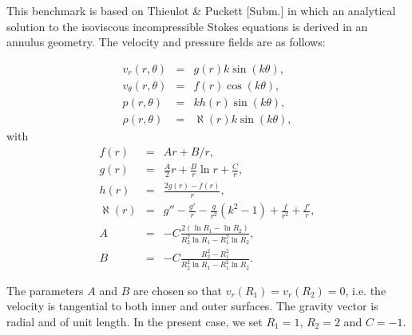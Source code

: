 This benchmark is based on Thieulot \& Puckett [Subm.] in which an analytical solution to the
isoviscous incompressible Stokes equations is derived in an annulus geometry.
The velocity and pressure fields are as follows:

\begin{eqnarray}
v_r(r,\theta)     &=&  g(r) k \sin(k\theta), \\
v_\theta(r,\theta)&=&  f(r) \cos(k \theta), \\ 
p(r,\theta)       &=&  k h(r) \sin(k \theta), \\
\rho (r,\theta)   &=& \aleph(r) k \sin (k \theta), 
\end{eqnarray}
with
\begin{eqnarray}
f(r)&=&Ar+B/r, \\
g(r) &=& \frac{A}{2}r  +  \frac{B}{r} \ln r + \frac{C}{r}, \\
h(r)&=& \frac{2g(r)-f(r)}{r},  \\
\aleph(r) &=& g'' - \frac{g'}{r}  - \frac{g}{r^2} (k^2 - 1)  + \frac{f}{r^2}   + \frac{f'}{r}, \\
A &=& -C\frac{2(\ln R_1 - \ln R_2)} { R_2^2 \ln R_1  - R_1^2 \ln R_2}, \\
B &=& -C \frac{R_2^2-R_1^2}{R_2^2 \ln R_1 - R_1^2 \ln R_2}.
\end{eqnarray}

The parameters $A$ and $B$ are chosen so that $v_r(R_1)=v_r(R_2)=0$, i.e.
the velocity is tangential to both inner and outer surfaces.
The gravity vector is radial and of unit length.
In the present case, we set $R_1=1$, $R_2=2$ and $C=-1$. 


